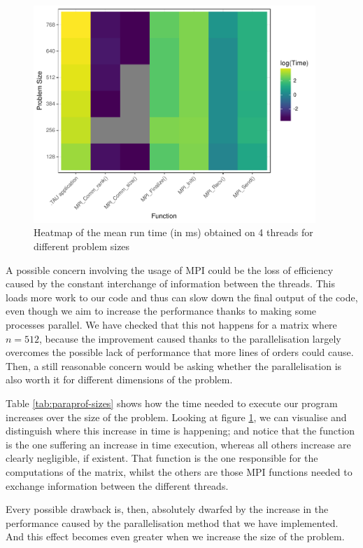 \begin{figure}[H]
	\centering
	\includegraphics[width=0.95\textwidth]{images/pprof-sizes}
	\caption{Heatmap of the mean run time (in ms) obtained on 4 threads for different problem sizes}
	\label{fig:paraprof-sizes-heat}
\end{figure}

A possible concern involving the usage of MPI could be the loss of efficiency caused by the constant interchange of information between the threads. This loads more work to our code and thus can slow down the final output of the code, even though we aim to increase the performance thanks to making some processes parallel. We have checked that this not happens for a matrix where $n = 512$, because the improvement caused thanks to the parallelisation largely overcomes the possible lack of performance that more lines of orders could cause. Then, a still reasonable concern would be asking whether the parallelisation is also worth it for different dimensions of the problem. 

Table \ref{tab:paraprof-sizes} shows how the time needed to execute our program increases over the size of the problem. Looking at figure \ref{fig:paraprof-sizes-heat}, we can visualise and distinguish where this increase in time is happening; and notice that the function  is the one suffering an increase in time execution, whereas all others increase are clearly negligible, if existent. That function is the one responsible for the computations of the matrix, whilst the others are those MPI functions needed to exchange information between the different threads.

Every possible drawback is, then, absolutely dwarfed by the increase in the performance caused by the parallelisation method that we have implemented. And this effect becomes even greater when we increase the size of the problem.

